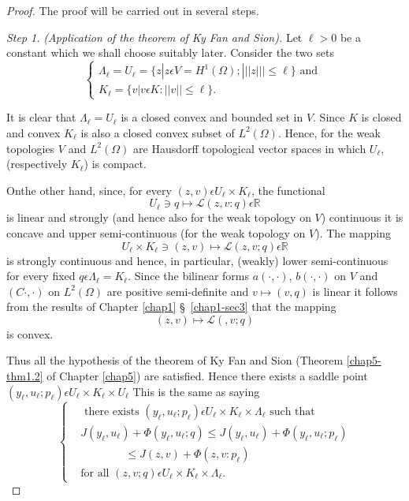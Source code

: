 \begin{proof}
The proof will be carried out in several steps.

{\em Step 1.} {\em(Application of the theorem of Ky Fan and Sion).} Let $\ell > 0$ be a constant which we shall choose suitably later. Consider the two sets
\begin{equation*}
\begin{cases}
\Lambda_{\ell} = U_{\ell} = \{ z | z \epsilon V = H^{1} (\Omega) ; |||z||| \leq \ell \} \text{ and }\\
K_{\ell} = \{v | v \epsilon K : ||v|| \leq \ell \}.\tag{1.10}\label{chap6-eq1.10}
\end{cases}
\end{equation*}

It is clear that $\Lambda_{\ell} = U_{\ell}$ is a closed convex and bounded set in $V$. Since $K$ is closed and convex $K_{\ell}$ is  also a closed convex subset of $L^{2} (\Omega)$. Hence, for the weak topologies $V$ and $L^{2}(\Omega)$ are Hausdorff topological vector spaces in which $U_{\ell}$, (respectively $K_{\ell}$) is compact.

On\pageoriginale the other hand, since, for every $(z, v) \epsilon U_{\ell} \times K_{\ell}$, the functional 
$$
U_{\ell} \ni q \mapsto \mathscr{L} (z, v : q) \epsilon \mathbb{R}
$$
is linear and strongly (and hence also for the weak topology on $V$) continuous it is concave and upper semi-continuous (for the weak topology on $V$). The mapping
$$
U_{\ell} \times K_{\ell} \ni (z, v) \mapsto \mathscr{L} (z, v ; q) \epsilon \mathbb{R}
$$
is strongly continuous and hence, in particular, (weakly) lower
semi-continuous for every fixed $q \epsilon \Lambda_{\ell} =
K_{\ell}$. Since the bilinear forms $a(\cdot , \cdot)$, $b(\cdot ,
\cdot)$ on $V$ and $(C \cdot , \cdot)$ on $L^{2} (\Omega)$ are
positive semi-definite and $v \mapsto (v, q)$ is linear it follows
from the results of Chapter \ref{chap1} \S\ \ref{chap1-sec3} that the
mapping 
$$
(z, v) \mapsto \mathscr{L}(, v; q)
$$
is convex.

Thus all the hypothesis of the theorem of Ky Fan and Sion (Theorem \ref{chap5-thm1.2} of Chapter \ref{chap5}) are satisfied. Hence there exists a saddle point $(y_{\ell}, u_{\ell} ; p_{\ell}) \epsilon U_{\ell} \times K_{\ell} \times U_{\ell}$ This is the same as saying
\begin{equation*}
\begin{cases}
& \text{ there exists } (y_{\ell}, u_{\ell} ; p_{\ell}) \epsilon U_{\ell} \times K_{\ell} \times \Lambda_{\ell} \text{ such that }\\
& J(y_{\ell}, u_{\ell}) + \Phi (y_{\ell}, u_{\ell} ; q) \leq
  J(y_{\ell}, u_{\ell}) + \Phi (y_{\ell}, u_{\ell}; p_{\ell})\\
&\qquad\qquad\leq J(z, v) + \Phi (z, v : p_{\ell})\\
& \text{for all } (z, v ; q) \epsilon U_{\ell} \times K_{\ell} \times \Lambda_{\ell}.\tag*{$(1.11)'$}\label{chap6-eq1.11'}
\end{cases}
\end{equation*}


\end{proof}
